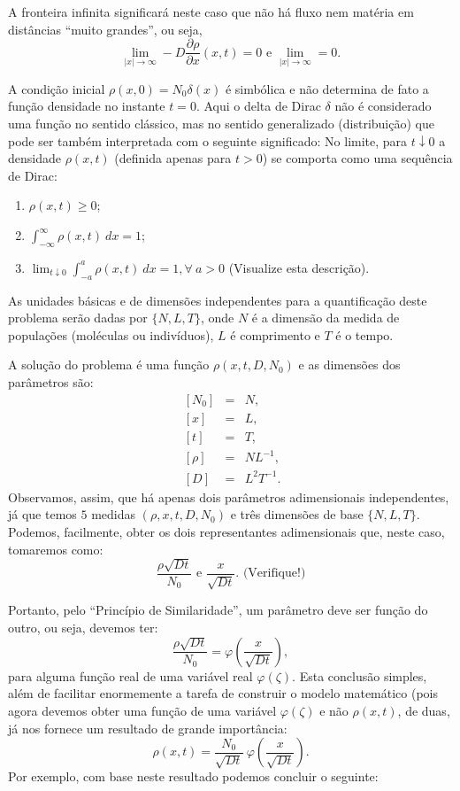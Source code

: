    A fronteira infinita significará neste caso que não há fluxo nem matéria em distâncias ``muito grandes'', ou seja,
    \[\lim_{|x| \to \infty} -D \dfrac{\partial \rho}{\partial x} (x, t) = 0 \mbox{ e } \lim_{|x| \to \infty} = 0.\]

    A condição inicial \(\rho(x, 0) = N_{0}\delta(x)\) é simbólica e não determina de fato a função densidade no instante \(t = 0\). Aqui o delta de Dirac \(\delta\) não é considerado uma função no sentido clássico, mas no sentido generalizado (distribuição) que pode ser também interpretada com o seguinte significado: No limite, para \(t \downarrow 0\) a densidade \(\rho(x, t)\) (definida apenas para \(t>0\)) se comporta como uma sequência de Dirac: {\red
    \begin{enumerate}
    \item \(\rho(x, t) \ge 0\);
    \item \(\displaystyle \int_{-\infty}^{\infty} \rho(x, t)\ dx = 1\);
    \item \(\displaystyle \lim_{t \downarrow 0} \int_{-a}^{a} \rho(x, t)\ dx = 1, \forall\ a > 0\) (Visualize esta descrição).
    \end{enumerate}
}


    As unidades básicas e de dimensões independentes para a quantificação deste problema serão dadas por \(\{N, L, T\}\), onde \(N\) é a dimensão da medida de populações (moléculas ou indivíduos), \(L\) é comprimento e \(T\) é o tempo.
    
    A solução do problema é uma função \(\rho(x, t, D, N_{0})\) e as dimensões dos parâmetros são:
    \[
    \begin{array}{rcl}
    \ [N_{0}] &=& N, \\
    \ [x] &=& L, \\
    \ [t] &=& T, \\
    \ [\rho] &=& NL^{-1}, \\
    \ [D] &=& L^{2}T^{-1}.
    \end{array}\]
    Observamos, assim, que há apenas dois parâmetros adimensionais independentes, já que temos \(5\) medidas \((\rho, x, t, D, N_{0})\) e três dimensões de base \(\{N, L, T\}\). Podemos, facilmente, obter os dois representantes adimensionais que, neste caso, tomaremos como:
    \[\dfrac{\rho \sqrt{Dt}}{N_{0}} \mbox{ e } \dfrac{x}{\sqrt{Dt}}. \mbox{ (Verifique!)}\]

    Portanto, pelo ``Princípio de Similaridade'', um parâmetro deve ser função do outro, ou seja, devemos ter:
    \[\dfrac{\rho \sqrt{Dt}}{N_{0}} = \varphi\left(\dfrac{x}{\sqrt{D t}}\right),\]
    para alguma função real de uma variável real \(\varphi(\zeta)\). Esta conclusão simples, além de facilitar enormemente a tarefa de construir o modelo matemático (pois agora devemos obter uma função de uma variável \(\varphi(\zeta)\) e não \(\rho(x,t)\), de duas, já nos fornece um resultado de grande importância:
    \[\rho(x, t) = \dfrac{N_{0}}{\sqrt{Dt}} \ \varphi\left(\dfrac{x}{\sqrt{D t}}\right).\]
    Por exemplo, com base neste resultado podemos concluir o seguinte:

